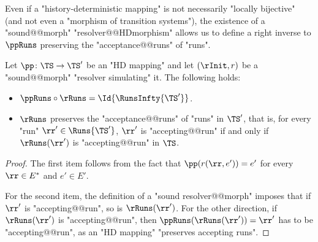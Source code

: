 \documentclass[10pt,a4paper]{amsart}
\begin{document}
Even if a "history-deterministic mapping" is not necessarily "locally bijective" (and not even a "morphism of transition systems"), the existence of a "sound@@morph" "resolver@@HDmorphism" allows us to define a right inverse to $\ppRuns$ preserving the "acceptance@@runs" of "runs". 

\begin{lemma}\label{lemma-morph:facts_HD_morphisms}
	Let $\pp\colon \TS \to \TS'$ be an "HD mapping" and let $(\rInit, r)$ be a "sound@@morph" "resolver simulating" it. The following holds:
	\begin{itemize}
		\item $\ppRuns \circ \rRuns = \Id{\RunsInfty{\TS'}}$.
		\item $\rRuns$ preserves the "acceptance@@runs" of "runs" in $\TS'$, that is,  for every "run" $\rr' \in \Runs{\TS'}$,  $\rr'$ is "accepting@@run" if and only if $\rRuns(\rr')$ is "accepting@@run" in $\TS$.
	\end{itemize}
\end{lemma}
\begin{proof}
	The first item follows from the fact that $\pp(r(\rr,e')) = e'$ for every $\rr\in E^*$ and $e'\in E'$. 
	
	For the second item, the definition of a "sound resolver@@morph" imposes that if $\rr'$ is "accepting@@run", so is $\rRuns(\rr')$. For the other direction, if $\rRuns(\rr')$ is "accepting@@run", then $\ppRuns(\rRuns(\rr')) = \rr'$ has to be "accepting@@run", as an "HD mapping" "preserves accepting runs".
\end{proof}
\end{document}
